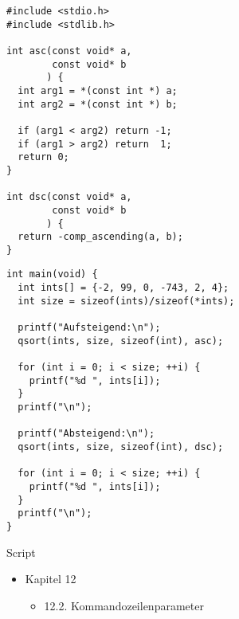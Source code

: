 \begin{frame}[fragile]
%
%
\begin{codebox}[Beispiel: \texttt{qsort}, equal height group=Gqsort]
\begin{verbatim}
#include <stdio.h>
#include <stdlib.h>
 
int asc(const void* a, 
        const void* b
       ) {
  int arg1 = *(const int *) a;
  int arg2 = *(const int *) b;
 
  if (arg1 < arg2) return -1;
  if (arg1 > arg2) return  1;
  return 0;
}

int dsc(const void* a, 
        const void* b
       ) {
  return -comp_ascending(a, b);
}
\end{verbatim}
\end{codebox}
%
\begin{codebox}[...Fortsetzung, equal height group=Gqsort]
\begin{verbatim}
int main(void) {
  int ints[] = {-2, 99, 0, -743, 2, 4};
  int size = sizeof(ints)/sizeof(*ints);
    
  printf("Aufsteigend:\n");
  qsort(ints, size, sizeof(int), asc);
    
  for (int i = 0; i < size; ++i) {
    printf("%d ", ints[i]);
  }
  printf("\n");
    
  printf("Absteigend:\n");
  qsort(ints, size, sizeof(int), dsc);
    
  for (int i = 0; i < size; ++i) {
    printf("%d ", ints[i]);
  }
  printf("\n");
}
\end{verbatim}
\end{codebox}
%
\end{frame}


\begin{frame}{Script}
%
\begin{itemize}
\item Kapitel 12
	\begin{itemize}
	\item 12.2. Kommandozeilenparameter
	\end{itemize}
\end{itemize}
%
\end{frame}


